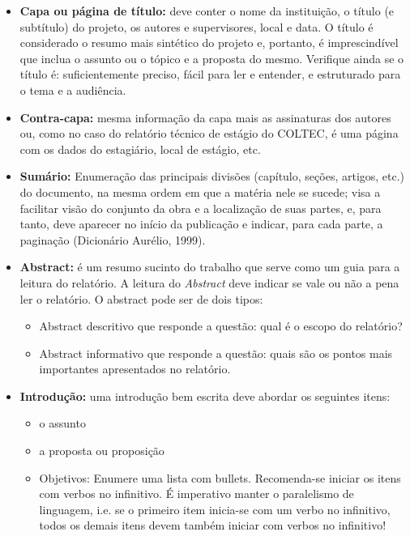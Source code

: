\begin{itemize}
\item {\bf Capa ou página de título: } deve conter o nome da instituição, o título (e subtítulo) do projeto, os autores e supervisores, local e data. O título é considerado o resumo mais sintético do projeto e, portanto, é imprescindível que inclua o assunto ou o tópico e a proposta do mesmo. Verifique ainda se o título é: suficientemente preciso, fácil para ler e entender, e  estruturado para o tema e a audiência. 

\item {\bf Contra-capa: } mesma informação da capa mais as assinaturas dos autores ou, como no caso do relatório técnico de estágio  do COLTEC, é uma página com os dados do estagiário, local de estágio, etc.

\item {\bf Sumário: } Enumeração das principais divisões (capítulo, seções, artigos, etc.) do documento, na mesma ordem em que a matéria nele se sucede; visa a facilitar visão do conjunto da obra e a localização de suas partes, e, para tanto, deve aparecer no início da publicação e indicar, para cada parte, a paginação (Dicionário Aurélio, 1999).

\item {\bf Abstract:} é um resumo sucinto do trabalho que serve como um guia para a leitura do relatório. A leitura do \emph{Abstract} deve indicar se vale ou não a pena ler o relatório. 
O abstract pode ser de dois tipos:

\begin{itemize}
  \item Abstract descritivo que responde a questão: qual é o escopo do relatório?
  
  \item Abstract informativo que responde a questão: quais são os pontos mais importantes apresentados no relatório.
\end{itemize}

\item {\bf Introdução:} uma introdução bem escrita deve abordar os seguintes itens:
  \begin{itemize}
  	\item o assunto
  	\item a proposta ou proposição
	\item Objetivos: 
	Enumere uma lista com bullets. Recomenda-se iniciar os itens com verbos no infinitivo. É imperativo manter o paralelismo de linguagem, i.e. se o primeiro item inicia-se com um verbo no infinitivo, todos os demais itens devem também iniciar com verbos no infinitivo!


\end{itemize}
\end{itemize}
